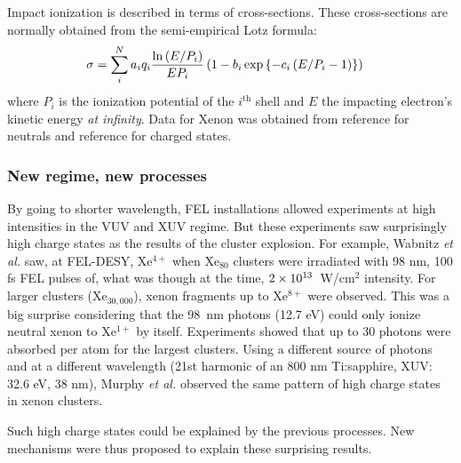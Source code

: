 Impact ionization is described in terms of cross-sections. These
cross-sections are normally obtained from the semi-empirical Lotz
formula\cite{Lotz1967}:
\begin{align}
\sigma & = \sum_{i}^{N} a_i q_i \frac{\ln{\left( E/P_i \right)}}{E P_i} \left( 1 - b_i
\exp{ \left\{ -c_i \left( E/P_i - 1 \right) \right\}} \right)
\label{eqn:impact:ionization:lotz}
\end{align}
where $P_i$ is the ionization potential of the $i^{\textrm{th}}$ shell and $E$
the impacting electron's kinetic energy \textit{at infinity}.
Data for Xenon was obtained from reference \cite{Tawara1987} for neutrals
and reference \cite{Heidenreich2005} for charged states.


\subsubsection{New regime, new processes}

By going to shorter wavelength, FEL installations allowed experiments at high
intensities in the VUV and XUV regime. But these experiments saw surprisingly
high charge states as the results of the cluster
explosion\cite{Wabnitz2002,Bostedt2010}. For example, Wabnitz \textit{et al.}
saw, at FEL-DESY, Xe$^{4+}$ when Xe$_{80}$ clusters were irradiated with 98 nm,
100 fs FEL pulses of, what was though at the time, $\ten{2}{13}$~W/cm$^2$
intensity. For larger clusters (Xe$_{30,000}$), xenon fragments up to
Xe$^{8+}$ were observed. This was a big surprise considering that the 98~nm
photons (12.7 eV) could only ionize neutral xenon to Xe$^{1+}$ by itself.
Experiments showed that up to 30 photons were absorbed per atom for the largest
clusters. Using a different source of photons and at a different wavelength
(21st harmonic of an 800 nm Ti:sapphire, XUV: 32.6 eV, 38 nm),
Murphy \textit{et al.} observed the same pattern of high charge states in xenon
clusters\cite{Murphy2008a,Murphy2008b}.

Such high charge states could be explained by the previous processes. New
mechanisms were thus proposed to explain these surprising results.




